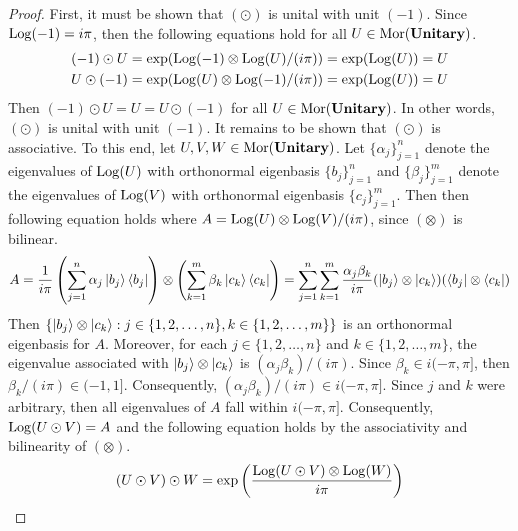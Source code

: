 \begin{proof}
    First, it must be shown that $( \odot )$ is unital with unit $( -1 )$.
    Since $\operatorname{Log}( -1 ) = i\pi$, then the following equations hold for all $U \in \operatorname{Mor}( \mathbf{Unitary} )$.
    \begin{align*}
        (-1) \odot U
        &=
        \exp( \operatorname{Log}(-1) \otimes \operatorname{Log}(U) / (i\pi) )
        =
        \exp( \operatorname{Log}( U ) )
        =
        U
        \\
        U \odot (-1)
        &=
        \exp( \operatorname{Log}(U) \otimes \operatorname{Log}(-1) / (i\pi) )
        =
        \exp( \operatorname{Log}( U ) )
        =
        U
    \end{align*}
    Then $(-1) \odot U = U = U \odot (-1)$ for all $U \in \operatorname{Mor}( \mathbf{Unitary} )$.
    In other words, $( \odot )$ is unital with unit $( -1 )$.
    It remains to be shown that $( \odot )$ is associative.
    To this end, let $U, V, W \in \operatorname{Mor}( \mathbf{Unitary} )$.
    Let $\{ \alpha_j \}_{j=1}^n$ denote the eigenvalues of $\operatorname{Log}( U )$ with orthonormal eigenbasis $\{ b_j \}_{j=1}^n$ and $\{ \beta_j \}_{j=1}^m$ denote the eigenvalues of $\operatorname{Log}( V )$ with orthonormal eigenbasis $\{ c_j \}_{j=1}^m$.
    Then then following equation holds where $A = \operatorname{Log}( U ) \otimes \operatorname{Log}( V ) / (i\pi)$, since $( \otimes )$ is bilinear.
    \begin{equation*}
        A
        =
        \frac{1}{i\pi}
        \left( \sum_{j=1}^n \alpha_j \ket{b_j} \bra{b_j} \right)
        \otimes
        \left( \sum_{k=1}^m \beta_k \ket{c_k} \bra{c_k} \right)
        =
        \sum_{j=1}^n
        \sum_{k=1}^m
        \frac{\alpha_j\beta_k}{i\pi} ( \ket{b_j} \otimes \ket{c_k} ) ( \bra{b_j} \otimes \bra{c_k} )
    \end{equation*}
    Then $\{ \ket{b_j} \otimes \ket{c_k} : j \in \{ 1, 2, \ldots, n \}, k \in \{ 1, 2, \ldots, m \} \}$ is an orthonormal eigenbasis for $A$.
    Moreover, for each $j \in \{ 1, 2, \ldots, n \}$ and $k \in \{ 1, 2, \ldots, m \}$, the eigenvalue associated with $\ket{b_j} \otimes \ket{c_k}$ is $(\alpha_j\beta_k)/(i\pi)$.
    Since $\beta_k \in i(-\pi,\pi]$, then $\beta_k/(i\pi) \in (-1,1]$.
    Consequently, $(\alpha_j\beta_k)/(i\pi) \in i(-\pi,\pi]$.
    Since $j$ and $k$ were arbitrary, then all eigenvalues of $A$ fall within $i(-\pi,\pi]$.
    Consequently, $\operatorname{Log}( U \odot V ) = A$ and the following equation holds by the associativity and bilinearity of $( \otimes )$.
    \begin{equation*}
        ( U \odot V ) \odot W
        =
        \exp\left( \frac{\Log( U \odot V ) \otimes \Log(W)}{i\pi} \right)

\end{equation*}
\end{proof}

